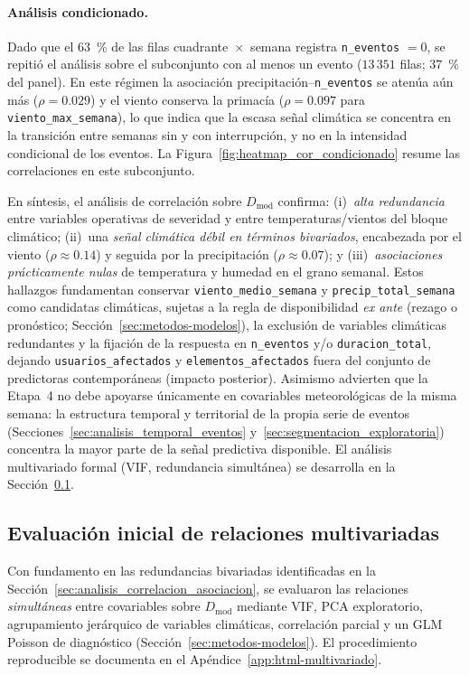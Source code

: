     \paragraph{Análisis condicionado.} Dado que el $63$~\% de las filas cuadrante~$\times$~semana registra \texttt{n\_eventos} $= 0$, se repitió el análisis sobre el subconjunto con al menos un evento ($13\,351$ filas; $37$~\% del panel). En este régimen la asociación precipitación--\texttt{n\_eventos} se atenúa aún más ($\rho = 0{.}029$) y el viento conserva la primacía ($\rho = 0{.}097$ para \texttt{viento\_max\_semana}), lo que indica que la escasa señal climática se concentra en la transición entre semanas sin y con interrupción, y no en la intensidad condicional de los eventos. La Figura~\ref{fig:heatmap_cor_condicionado} resume las correlaciones en este subconjunto.
    
    
    \noindent En síntesis, el análisis de correlación sobre $D_{\mathrm{mod}}$ confirma: (i)~\textit{alta redundancia} entre variables operativas de severidad y entre temperaturas/vientos del bloque climático; (ii)~una \textit{señal climática débil en términos bivariados}, encabezada por el viento ($\rho \approx 0{.}14$) y seguida por la precipitación ($\rho \approx 0{.}07$); y (iii)~\textit{asociaciones prácticamente nulas} de temperatura y humedad en el grano semanal. Estos hallazgos fundamentan conservar \texttt{viento\_medio\_semana} y \texttt{precip\_total\_semana} como candidatas climáticas, sujetas a la regla de disponibilidad \emph{ex ante} (rezago o pronóstico; Sección~\ref{sec:metodos-modelos}), la exclusión de variables climáticas redundantes y la fijación de la respuesta en \texttt{n\_eventos} y/o \texttt{duracion\_total}, dejando \texttt{usuarios\_afectados} y \texttt{elementos\_afectados} fuera del conjunto de predictoras contemporáneas (impacto posterior). Asimismo advierten que la Etapa~4 no debe apoyarse únicamente en covariables meteorológicas de la misma semana: la estructura temporal y territorial de la propia serie de eventos (Secciones~\ref{sec:analisis_temporal_eventos} y~\ref{sec:segmentacion_exploratoria}) concentra la mayor parte de la señal predictiva disponible. El análisis multivariado formal (VIF, redundancia simultánea) se desarrolla en la Sección~\ref{sec:evaluacion_multivariada}.
    
\subsection{Evaluación inicial de relaciones multivariadas}
\label{sec:evaluacion_multivariada}
    Con fundamento en las redundancias bivariadas identificadas en la Sección~\ref{sec:analisis_correlacion_asociacion}, se evaluaron las relaciones \textit{simultáneas} entre covariables sobre $D_{\mathrm{mod}}$ mediante VIF, PCA exploratorio, agrupamiento jerárquico de variables climáticas, correlación parcial y un GLM Poisson de diagnóstico (Sección~\ref{sec:metodos-modelos}). El procedimiento reproducible se documenta en el Apéndice~\ref{app:html-multivariado}.
    
